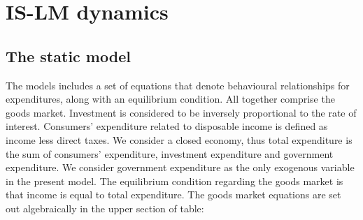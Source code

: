 \documentclass[a4paper,11pt]{report}
\begin{document}
\section{IS-LM dynamics}
\subsection{The static model}
The models includes a set of equations that denote behavioural relationships for expenditures, along with an equilibrium condition. All together comprise the goods market. Investment is considered to be inversely proportional to the rate of interest. Consumers' expenditure related to disposable income is defined as income less direct taxes. We consider a closed economy, thus total expenditure is the sum of consumers' expenditure, investment expenditure and government expenditure. We consider government expenditure as the only exogenous variable in the present model. The equilibrium condition regarding the goods market is that income is equal to total expenditure. The goods market equations are set out algebraically in the upper section of table:
\end{document}

